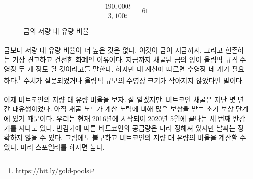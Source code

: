 \begin{figure}
	\centering
	\begin{equation}
		\frac{190,000 t}{3,100 t} = ~ 61
	\end{equation}
	\caption{금의 저량 대 유량 비율}
	\label{fig:stock-to-flow-gold}
\end{figure}

\paragraph{}
\begin{comment}	
	Nothing has a higher stock-to-flow ratio than gold. This is why gold, up to now,
	was the hardest, soundest money in existence. It is often said that all the gold
	mined so far would fit in two olympic-sized swimming pools. According to my
	calculations\footnote{\url{https://bit.ly/gold-pools}}, we would need four. So
	maybe this needs updating, or Olympic-sized swimming pools got smaller.
\end{comment}
금보다 저량 대 유량 비율이 더 높은 것은 없다. 
이것이 금이 지금까지, 그리고 현존하는 가장 견고하고 건전한 화폐인 이유이다. 
지금까지 채굴된 금의 양이 올림픽 규격 수영장 두 개 정도 될 것이라고들 말한다.
하지만 내 계산에 따르면 수영장 네 개가 필요하다.\footnote{\url{https://bit.ly/gold-pools}}
수치가 잘못되었거나 올림픽 규모의 수영장 크기가 작아지지 않았다면 말이다.

\paragraph{}
\begin{comment}	
	Enter Bitcoin. As you probably know, bitcoin mining was all the rage in
	the last couple of years. This is because we are still in the early
	phases of what is called the \textit{reward era}, where mining nodes are
	rewarded with \textit{a lot} of bitcoin for their computational effort. We are
	currently in reward era number 3, which began in 2016 and will end in
	early 2020, probably in May. While the bitcoin supply is predetermined,
	the inner workings of Bitcoin only allow for approximate dates.
	Nevertheless, we can predict with certainty how high Bitcoin's
	stock-to-flow ratio will be. Spoiler alert: it will be high.
\end{comment}
이제 비트코인의 저량 대 유량 비율을 보자. 
잘 알겠지만, 비트코인 채굴은 지난 몇 년간 대유행이었다.
아직 채굴 노드가 계산 노력에 비해 많은 보상을 받는 초기 보상 단계에 있기 때문이다.
우리는 현재 2016년에 시작되어 2020년 5월에 끝나는 세 번째 반감기를 지나고 있다.
반감기에 따른 비트코인의 공급량은 미리 정해져 있지만 날짜는 정확하지 않을 수 있다.
그럼에도 불구하고 비트코인의 저량 대 유량의 비율을 계산할 수 있다.
미리 스포일러를 하자면 높다.


